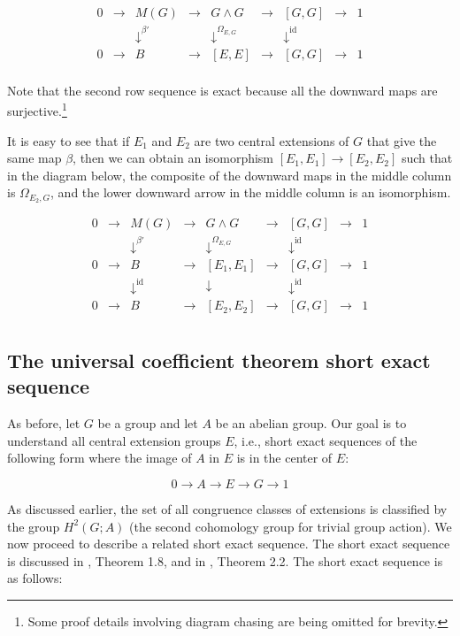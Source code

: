 $$\begin{array}{ccccccccc}
0 & \to & M(G) & \to & G \wedge G & \to & [G,G] & \to & 1\\
 &&   \downarrow^{\beta'}  &&  \downarrow^{\Omega_{E,G}}     && \downarrow^{\text{id}} && \\
0 & \to & B &\to & [E,E] & \to & [G,G] & \to & 1\\
\end{array}$$

Note that the second row sequence is exact because all the downward
maps are surjective.\footnote{Some proof details involving diagram
  chasing are being omitted for brevity.}

It is easy to see that if $E_1$ and $E_2$ are two central extensions
of $G$ that give the same map $\beta$, then we can obtain an
isomorphism $[E_1,E_1] \to [E_2,E_2]$ such that in the diagram below,
the composite of the downward maps in the middle column is
$\Omega_{E_2,G}$, and the lower downward arrow in the middle column is
an isomorphism.

$$\begin{array}{ccccccccc}
0 & \to & M(G) & \to & G \wedge G & \to & [G,G] & \to & 1\\
 &&   \downarrow^{\beta'}  &&  \downarrow^{\Omega_{E,G}}     && \downarrow^{\text{id}} && \\
0 & \to & B &\to & [E_1,E_1] & \to & [G,G] & \to & 1\\
 &&   \downarrow^{\operatorname{id}}  && \downarrow && \downarrow^{\text{id}} && \\
0 & \to & B &\to & [E_2,E_2] & \to & [G,G] & \to & 1\\
\end{array}$$

\subsection{The universal coefficient theorem short exact sequence}\label{sec:ses-uct}

As before, let $G$ be a group and let $A$ be an abelian group. Our
goal is to understand all central extension groups $E$, i.e., short
exact sequences of the following form where the image of $A$ in $E$ is
in the center of $E$:

$$0 \to A \to E \to G \to 1$$

As discussed earlier, the set of all congruence classes of extensions
is classified by the group $H^2(G;A)$ (the second cohomology group for
trivial group action). We now proceed to describe a related short exact
sequence. The short exact sequence is discussed in
\cite{BeylIsoclinisms}, Theorem 1.8, and in
\cite{EckmannHiltonStammbach}, Theorem 2.2. The short exact sequence
is as follows:

